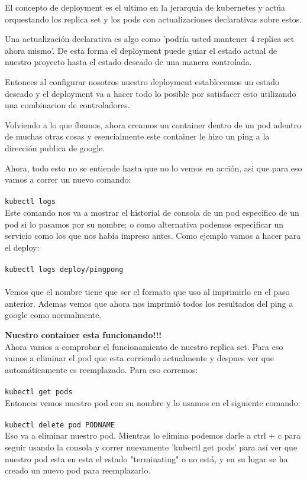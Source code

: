 \documentclass[11pt]{article} %
\begin{document}
El concepto de deployment es el ultimo en la jerarquía de kubernetes y actúa orquestando los replica set y los pods con actualizaciones declarativas sobre estos.

Una actualización declarativa es algo como 'podría usted mantener 4 replica set ahora mismo'. De esta forma el deployment puede guiar el estado actual de nuestro proyecto hasta el estado deseado de una manera controlada.

Entonces al configurar nosotros nuestro deployment establecemos un estado deseado y el deployment va a hacer todo lo posible por satisfacer esto utilizando una combinacion de controladores.

Volviendo a lo que íbamos, ahora creamos un container dentro de un pod adentro de muchas otras cosas y esencialmente este container le hizo un ping a la dirección publica de google.

Ahora, todo esto no se entiende hasta que no lo vemos en acción, asi que para eso vamos a correr un nuevo comando:\\ \\
    \texttt{kubectl logs} \\ 

Este comando nos va a mostrar el historial de consola de un pod especifico de un pod si lo pasamos por su nombre; o como alternativa podemos especificar un servicio como los que nos había impreso antes. Como ejemplo vamos a hacer para el deploy: \\ \\
    \texttt{kubectl logs deploy/pingpong} \\ \\

Vemos que el nombre tiene que ser el formato que uso al imprimirlo en el paso anterior. Ademas vemos que ahora nos imprimió todos los resultados del ping a google como normalmente.

\textbf{Nuestro container esta funcionando!!!}\\

Ahora vamos a comprobar el funcionamiento de nuestro replica set. Para eso vamos a eliminar el pod que esta corriendo actualmente y despues ver que automáticamente es reemplazado. Para eso corremos:\\ \\ 
    \texttt{kubectl get pods} \\

Entonces vemos nuestro pod con su nombre y lo usamos en el siguiente comando:\\ \\
    \texttt{kubectl delete pod PODNAME} \\

Eso va a eliminar nuestro pod. Mientras lo elimina podemos darle a ctrl + c para seguir usando la consola y correr nuevamente 'kubectl get pods' para así ver que nuestro pod esta en esta el estado "terminating" o no está, y en su lugar se ha creado un nuevo pod para reemplazarlo.
\end{document}
